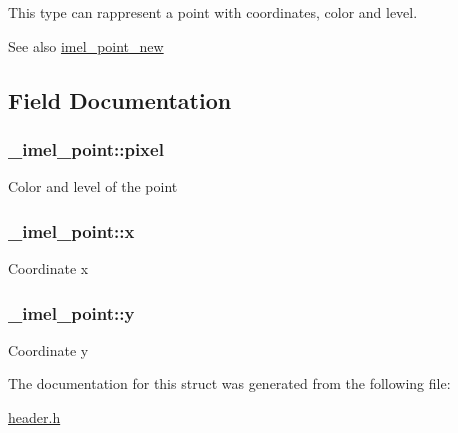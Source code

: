 This type can rappresent a point with coordinates, color and level.

\begin{DoxySeeAlso}{See also}
\hyperlink{point_8c_a20c030176364130df49237e29b69308c}{imel\+\_\+point\+\_\+new} 
\end{DoxySeeAlso}


\subsection{Field Documentation}
\subsubsection[{\texorpdfstring{pixel}{pixel}}]{ \+\_\+imel\+\_\+point\+::pixel}\hypertarget{struct__imel__point_af4b99377296131681a16ab67599c152b}{}\label{struct__imel__point_af4b99377296131681a16ab67599c152b}
Color and level of the point 
\subsubsection[{\texorpdfstring{x}{x}}]{ \+\_\+imel\+\_\+point\+::x}\hypertarget{struct__imel__point_ae691eec1e0fdf37d07d13d44a0e0539c}{}\label{struct__imel__point_ae691eec1e0fdf37d07d13d44a0e0539c}
Coordinate x 
\subsubsection[{\texorpdfstring{y}{y}}]{ \+\_\+imel\+\_\+point\+::y}\hypertarget{struct__imel__point_a30dc84507e749f7157cecd08cb045b4e}{}\label{struct__imel__point_a30dc84507e749f7157cecd08cb045b4e}
Coordinate y 

The documentation for this struct was generated from the following file\+:\begin{DoxyCompactItemize}
\item 
\hyperlink{header_8h}{header.\+h}\end{DoxyCompactItemize}
